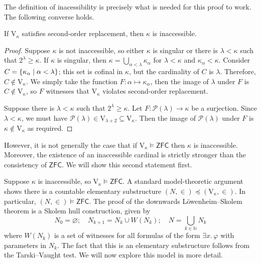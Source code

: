 The definition of inacessibility is precisely what is needed for this proof to work.
The following converse holds.
\begin{theorem}[Shepherdson]
    If \( \mathrm{V}_\kappa \) satisfies second-order replacement, then \( \kappa \) is inaccessible.
\end{theorem}
\begin{proof}
    Suppose \( \kappa \) is not inaccessible, so either \( \kappa \) is singular or there is \( \lambda < \kappa \) such that \( 2^\lambda \geq \kappa \).
    If \( \kappa \) is singular, then \( \kappa = \bigcup_{\alpha < \lambda} \kappa_\alpha \) for \( \lambda < \kappa \) and \( \kappa_\alpha < \kappa \).
    Consider \( C = \qty{\kappa_\alpha \mid \alpha < \lambda} \); this set is cofinal in \( \kappa \), but the cardinality of \( C \) is \( \lambda \).
    Therefore, \( C \notin \mathrm{V}_\kappa \).
    We simply take the function \( F : \alpha \mapsto \kappa_\alpha \), then the image of \( \lambda \) under \( F \) is \( C \notin \mathrm{V}_\kappa \), so \( F \) witnesses that \( \mathrm{V}_\kappa \) violates second-order replacement.

    Suppose there is \( \lambda < \kappa \) such that \( 2^\lambda \geq \kappa \).
    Let \( F : \mathcal P(\lambda) \to \kappa \) be a surjection.
    Since \( \lambda < \kappa \), we must have \( \mathcal P(\lambda) \in \mathrm{V}_{\lambda + 2} \subseteq \mathrm{V}_\kappa \).
    Then the image of \( \mathcal P(\lambda) \) under \( F \) is \( \kappa \notin \mathrm{V}_\kappa \) as required.
\end{proof}
However, it is not generally the case that if \( \mathrm{V}_\kappa \vDash \mathsf{ZFC} \) then \( \kappa \) is inaccessible.
Moreover, the existence of an inaccessible cardinal is strictly stronger than the consistency of \( \mathsf{ZFC} \).
We will show this second statement first.

Suppose \( \kappa \) is inaccessible, so \( \mathrm{V}_\kappa \vDash \mathsf{ZFC} \).
A standard model-theoretic argument shows there is a countable elementary substructure \( (N, \in) \preceq (\mathrm{V}_\kappa, \in) \).
In particular, \( (N, \in) \vDash \mathsf{ZFC} \).
The proof of the downwards L\"owenheim--Skolem theorem is a Skolem hull construction, given by
\[ N_0 = \varnothing;\quad N_{k+1} = N_k \cup W(N_k);\quad N = \bigcup_{k \in \mathbb N} N_k \]
where \( W(N_k) \) is a set of witnesses for all formulas of the form \( \exists x.\, \varphi \) with parameters in \( N_k \).
The fact that this is an elementary substructure follows from the Tarski--Vaught test.
We will now explore this model in more detail.


